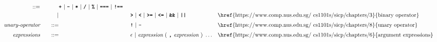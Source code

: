 \begin{alignat*}{9}
                        && ::= &\quad && \textbf{\texttt{+}}\ |\ \textbf{\texttt{-}}\ |\ \textbf{\texttt{*}}\ |\ \textbf{\texttt{/}}\ |\ \textbf{\texttt{\%}}\ |\ 
                                   \textbf{\texttt{===}}\ |\ \textbf{\texttt{!==}}\ \\
&&                       && |  &\quad &&  \texttt{\textbf{>}}\ |\ \texttt{\textbf{<}}\ |\ \texttt{\textbf{>=}}\ |\ \texttt{\textbf{<=}}\
                                          |\ \textbf{\texttt{\&\&}}\ |\ \texttt{\textbf{||}}
                                          && \textrm{\href{https://www.comp.nus.edu.sg/~cs1101s/sicp/chapters/3}{binary operator}}\\[1mm]
&& \textit{unary-operator}    
                        && ::= &\quad && \textbf{\texttt{!}}\ |\ \textbf{\texttt{-}}
                        && \textrm{\href{https://www.comp.nus.edu.sg/~cs1101s/sicp/chapters/8}{unary operator}}\\[1mm]
&& \textit{expressions}  && ::= &\quad && \epsilon\ | \ \textit{expression}\ (
                                                               \ \textbf{\texttt{,}} \
                                                                 \textit{expression} \ 
                                                                      )\ \ldots
                                                            && \textrm{\href{https://www.comp.nus.edu.sg/~cs1101s/sicp/chapters/6}{argument expressions}} 
\end{alignat*}

\newpage















    
